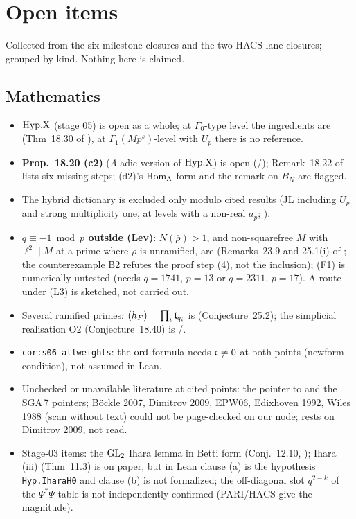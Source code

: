 \section{Open items}\label{sec:open}
Collected from the six milestone closures and the two HACS lane closures; grouped by kind. Nothing here is claimed.

\subsection{Mathematics}
\begin{itemize}
\item \textbf{$\mathrm{Hyp.X}$} (stage 05) is open as a whole; at $\Gamma_0$-type level the ingredients are \stcited{} (Thm~18.30 of \mainpdf), at $\Gamma_1(Mp^s)$-level with $U_p$ there is no reference.
\item \textbf{Prop.~18.20 (c2)} ($\Lambda$-adic version of $\mathrm{Hyp.X}$) is open (\stconj/\stopen); Remark~18.22 of \mainpdf{} lists
  six missing steps; (d2)'s $\operatorname{Hom}_\Lambda$ form and the remark on $B_N$ are flagged.
\item The hybrid dictionary is excluded only modulo cited results (JL including $U_p$ and strong multiplicity one, at levels
  with a non-real $a_p$; \stpmc).
\item \textbf{$q\equiv-1\bmod p$ outside (Lev)}: $N(\bar\rho)>1$, and non-squarefree $M$ with $\ell^2\mid M$ at a prime where $\bar\rho$ is unramified, are \stopen{} (Remarks~23.9 and 25.1(i) of \mainpdf; the counterexample B2 refutes the proof
  step (4), not the inclusion); (F1) is numerically untested (needs $q=1741$, $p=13$ or $q=2311$, $p=17$). A route under
  (L3) is sketched, not carried out.
\item Several ramified primes: $(h_F)=\prod_i\mathfrak{t}_{q_i}$ is \stconj{} (Conjecture~25.2);
  the simplicial realisation O2 (Conjecture~18.40) is \stconj/\stopen.
\item \texttt{cor:s06-allweights}: the $\mathrm{ord}$-formula needs $\mathfrak{c}\ne0$ at both points (newform condition), not assumed in Lean.
\item Unchecked or unavailable literature at cited points: the pointer to \cite[Thm~14.4]{JL} and the SGA\,7 pointers;
  B\"ockle 2007, Dimitrov 2009, EPW06, Edixhoven 1992, Wiles 1988 (scan without text) could not be page-checked on our node;
  \cite[Lemma~2.4]{KO} rests on Dimitrov 2009, not read.
\item Stage-03 items: the $\mathrm{GL}_2$ Ihara lemma in Betti form (Conj.~12.10, \stexp); Ihara (iii) (Thm~11.3) is \stpmc{} on paper, but in Lean clause (a) is the hypothesis \texttt{Hyp.IharaH0} and clause (b) is not formalized; the off-diagonal slot
  $q^{2-k}$ of the $\Psi^*\Psi$ table is not independently confirmed (PARI/HACS give the magnitude).
\end{itemize}

